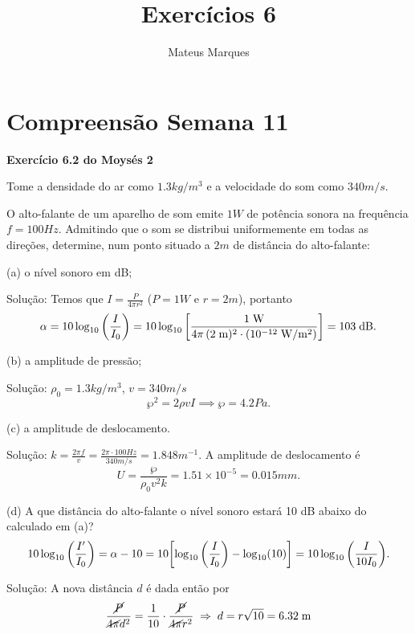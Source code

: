 \documentclass[a4paper,10pt]{article}
\title{\Huge{\textbf{Exercícios 6}}}
\author{Mateus Marques}
\begin{document}
\maketitle

\section{Compreensão Semana 11}

\textbf{Exercício 6.2 do Moysés 2}

\n

Tome a densidade do ar como $1.3 \unit{kg/m^3}$ e a velocidade do som como $340 \unit{m/s}$.

\n

O alto-falante de um aparelho de som emite $1 \unit{W}$ de potência sonora na frequência
$f = 100 \unit{Hz}$. Admitindo que o som se distribui uniformemente em todas as direções,
determine, num ponto situado a $2 \unit{m}$ de distância do alto-falante:

\n\n

(a) o nível sonoro em dB;

\n

Solução: Temos que $I = \frac{P}{4\pi r^2}$ ($P = 1\unit{W}$ e $r=2\unit{m}$), portanto
$$
\alpha = 10 \log_{10}\qty(\frac{I}{I_0}) =
10 \log_{10}\qty[\frac{1 \; \mathrm{W}}{4\pi \, (2 \; \mathrm{m})^2 \cdot (10^{-12} \; \mathrm{W/m^2})}] = 103 \; \mathrm{dB}.
$$

\n

(b) a amplitude de pressão;

\n

Solução: $\rho_0 = 1.3 \unit{kg/m^3}$, $v = 340 \unit{m/s}$
$$
\wp^2 = 2 \rho v I \implies \boxed{\wp = 4.2 \unit{Pa}.}
$$

\n

(c) a amplitude de deslocamento.

\n

Solução: $k = \frac{2\pi f}{v} = \frac{2\pi \cdot 100\unit{Hz}}{340 \unit{m/s}} = 1.848 \unit{m^{-1}}$. A amplitude de deslocamento é
$$
U = \frac{\wp}{\rho_0 v^2 k} = 1.51 \times 10^{-5} = 0.015 \unit{mm}.
$$

\n

\n

(d) A que distância do alto-falante o nível sonoro estará 10 dB abaixo do calculado em (a)?
$$
10 \log_{10}\qty(\frac{I'}{I_0}) =
\alpha - 10 = 10 \qty[\log_{10}\qty(\frac{I}{I_0}) - \log_{10}(10)] = 10 \log_{10}\qty(\frac{I}{10 I_0}).
$$

Solução: A nova distância $d$ é dada então por
$$
\frac{\cancel{P}}{\cancel{4\pi} d^2} = \frac{1}{10} \cdot \frac{\cancel{P}}{\cancel{4\pi} r^2} \; \Rightarrow \;
d = r \sqrt{10} = 6.32 \; \mathrm{m}
$$
\end{document}
